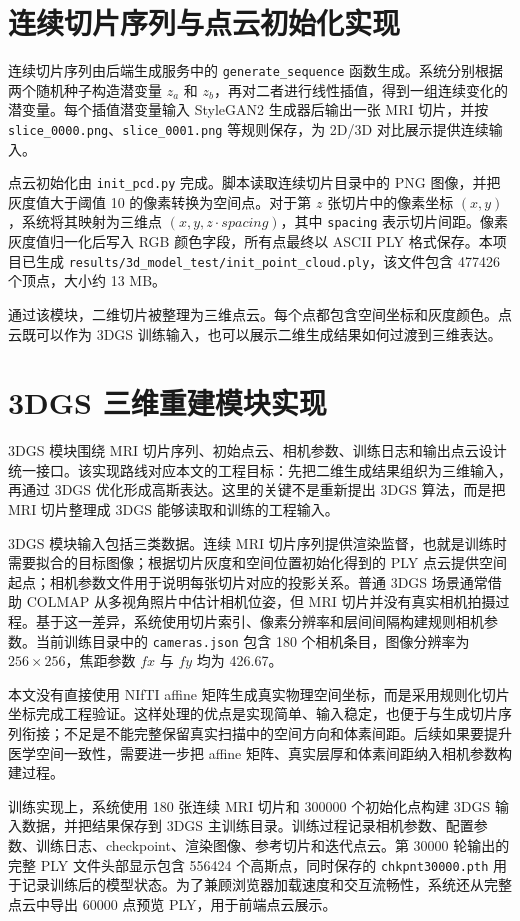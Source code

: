 \section{连续切片序列与点云初始化实现}
连续切片序列由后端生成服务中的 \texttt{generate\_sequence} 函数生成。系统分别根据两个随机种子构造潜变量 $z_a$ 和 $z_b$，再对二者进行线性插值，得到一组连续变化的潜变量。每个插值潜变量输入 StyleGAN2 生成器后输出一张 MRI 切片，并按 \texttt{slice\_0000.png}、\texttt{slice\_0001.png} 等规则保存，为 2D/3D 对比展示提供连续输入。

点云初始化由 \texttt{init\_pcd.py} 完成。脚本读取连续切片目录中的 PNG 图像，并把灰度值大于阈值 10 的像素转换为空间点。对于第 $z$ 张切片中的像素坐标 $(x,y)$，系统将其映射为三维点 $(x,y,z\cdot spacing)$，其中 \texttt{spacing} 表示切片间距。像素灰度值归一化后写入 RGB 颜色字段，所有点最终以 ASCII PLY 格式保存。本项目已生成 \texttt{results/3d\_model\_test/init\_point\_cloud.ply}，该文件包含 477426 个顶点，大小约 13 MB。

通过该模块，二维切片被整理为三维点云。每个点都包含空间坐标和灰度颜色。点云既可以作为 3DGS 训练输入，也可以展示二维生成结果如何过渡到三维表达。

\section{3DGS 三维重建模块实现}
3DGS 模块围绕 MRI 切片序列、初始点云、相机参数、训练日志和输出点云设计统一接口。该实现路线对应本文的工程目标：先把二维生成结果组织为三维输入，再通过 3DGS 优化形成高斯表达。这里的关键不是重新提出 3DGS 算法，而是把 MRI 切片整理成 3DGS 能够读取和训练的工程输入。

3DGS 模块输入包括三类数据。连续 MRI 切片序列提供渲染监督，也就是训练时需要拟合的目标图像；根据切片灰度和空间位置初始化得到的 PLY 点云提供空间起点；相机参数文件用于说明每张切片对应的投影关系。普通 3DGS 场景通常借助 COLMAP 从多视角照片中估计相机位姿，但 MRI 切片并没有真实相机拍摄过程。基于这一差异，系统使用切片索引、像素分辨率和层间间隔构建规则相机参数。当前训练目录中的 \texttt{cameras.json} 包含 180 个相机条目，图像分辨率为 $256\times256$，焦距参数 $fx$ 与 $fy$ 均为 426.67。

本文没有直接使用 NIfTI affine 矩阵生成真实物理空间坐标，而是采用规则化切片坐标完成工程验证。这样处理的优点是实现简单、输入稳定，也便于与生成切片序列衔接；不足是不能完整保留真实扫描中的空间方向和体素间距。后续如果要提升医学空间一致性，需要进一步把 affine 矩阵、真实层厚和体素间距纳入相机参数构建过程。

训练实现上，系统使用 180 张连续 MRI 切片和 300000 个初始化点构建 3DGS 输入数据，并把结果保存到 3DGS 主训练目录。训练过程记录相机参数、配置参数、训练日志、checkpoint、渲染图像、参考切片和迭代点云。第 30000 轮输出的完整 PLY 文件头部显示包含 556424 个高斯点，同时保存的 \texttt{chkpnt30000.pth} 用于记录训练后的模型状态。为了兼顾浏览器加载速度和交互流畅性，系统还从完整点云中导出 60000 点预览 PLY，用于前端点云展示。


